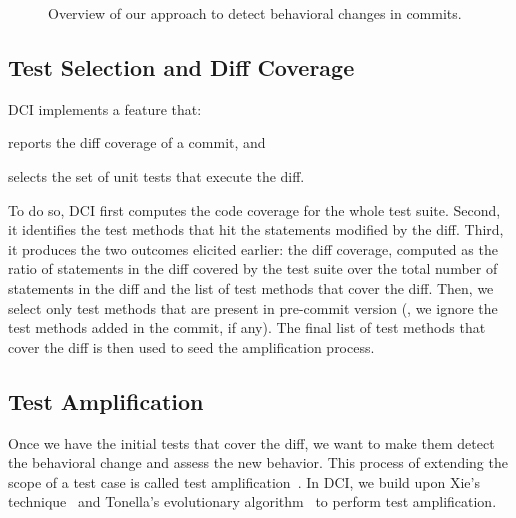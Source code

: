 \begin{figure}
    \caption{Overview of our approach to detect behavioral changes in commits.}
    \label{fig:global_approach}
\end{figure}

\subsection{Test Selection and Diff Coverage}
\label{subsec:compute_diff_coverage}
DCI implements a feature that:
\begin{enumerate*}
\item reports the diff coverage of a commit, and
\item selects the set of unit tests that execute the diff.
\end{enumerate*}
%
To do so, DCI first computes the code coverage for the whole test suite.
Second, it identifies the test methods that hit the statements modified by the diff. 
Third, it produces the two outcomes elicited earlier: the diff coverage, computed as the ratio of statements in the diff covered by the test suite over the total number of statements in the diff and the list of test methods that cover the diff.
%
Then, we select only test methods that are present in pre-commit version (\ie, we ignore the test methods added in the commit, if any).
The final list of test methods that cover the diff is then used to seed the amplification process.

\subsection{Test Amplification}

Once we have the initial tests that cover the diff, we want to make them detect the behavioral change and assess the new behavior.
This process of extending the scope of a test case is called test amplification~\cite{zhang2012}.
In DCI, we build upon Xie's technique~\cite{TaoXie2006} and Tonella's evolutionary algorithm~\cite{tonella} to perform test amplification.

